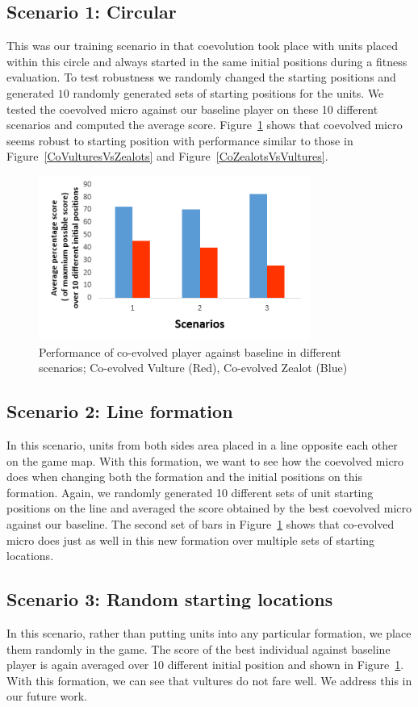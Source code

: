 \documentclass[conference,10pt]{IEEEtran}
\begin{document}
\subsection{Scenario 1: Circular}
This was our training scenario in that coevolution took place with
units placed within this circle and always started in the same initial
positions during a fitness evaluation. To test robustness we randomly
changed the starting positions and generated $10$ randomly generated
sets of starting positions for the units. We tested the coevolved
micro against our baseline player on these 10 different scenarios and
computed the average score. Figure~\ref{barOneVOne} shows that
coevolved micro seems robust to starting position with performance
similar to those in Figure~\ref{CoVulturesVsZealots} and
Figure~\ref{CoZealotsVsVultures}.
\begin{figure}
    \centerline{
      \includegraphics[width=3.5in]{VvZ.png}
      }
    \caption{Performance of co-evolved player against baseline in different scenarios; Co-evolved Vulture (Red), Co-evolved Zealot (Blue)}
    \label{barOneVOne}
\end{figure}

\subsection{Scenario 2: Line formation}
In this scenario, units from both sides area placed in a line opposite
each other on the game map. With this formation, we want to see how
the coevolved micro does when changing both the formation and the
initial positions on this formation. Again, we randomly generated 10
different sets of unit starting positions on the line and averaged the
score obtained by the best coevolved micro against our baseline.  The
second set of bars in Figure~\ref{barOneVOne} shows that co-evolved
micro does just as well in this new formation over multiple sets of
starting locations.

\subsection{Scenario 3: Random starting locations}
In this scenario, rather than putting units into any particular
formation, we place them randomly in the game.  The score of the best
individual against baseline player is again averaged over 10 different
initial position and shown in Figure~\ref{barOneVOne}. With this
formation, we can see that vultures do not fare well. We address this
in our future work.
%
\end{document}
